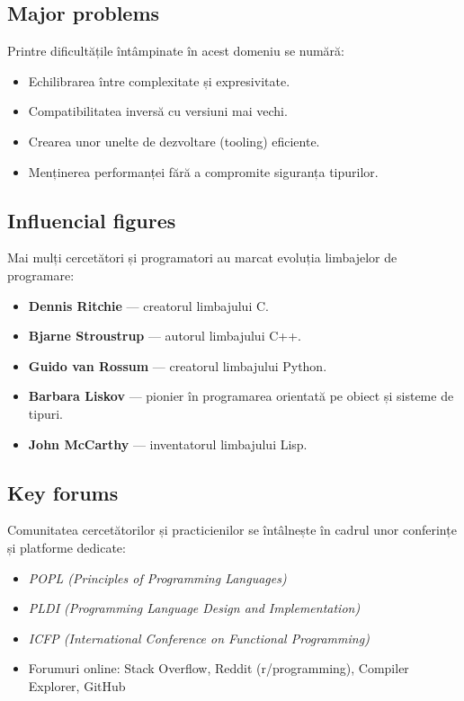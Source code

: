 \documentclass[12pt, letterpaper]{article}
\begin{document}
\subsection*{Major problems}
Printre dificultățile întâmpinate în acest domeniu se numără:
\begin{itemize}
    \item Echilibrarea între complexitate și expresivitate.
    \item Compatibilitatea inversă cu versiuni mai vechi.
    \item Crearea unor unelte de dezvoltare (tooling) eficiente.
    \item Menținerea performanței fără a compromite siguranța tipurilor.
\end{itemize}

\subsection*{Influencial figures}
Mai mulți cercetători și programatori au marcat evoluția limbajelor de programare:
\begin{itemize}
    \item \textbf{Dennis Ritchie} — creatorul limbajului C.
    \item \textbf{Bjarne Stroustrup} — autorul limbajului C++.
    \item \textbf{Guido van Rossum} — creatorul limbajului Python.
    \item \textbf{Barbara Liskov} — pionier în programarea orientată pe obiect și sisteme de tipuri.
    \item \textbf{John McCarthy} — inventatorul limbajului Lisp.
\end{itemize}

\subsection*{Key forums}
Comunitatea cercetătorilor și practicienilor se întâlnește în cadrul unor conferințe și platforme dedicate:
\begin{itemize}
    \item \textit{POPL (Principles of Programming Languages)}
    \item \textit{PLDI (Programming Language Design and Implementation)}
    \item \textit{ICFP (International Conference on Functional Programming)}
    \item Forumuri online: Stack Overflow, Reddit (r/programming), Compiler Explorer, GitHub
\end{itemize}
\end{document}

